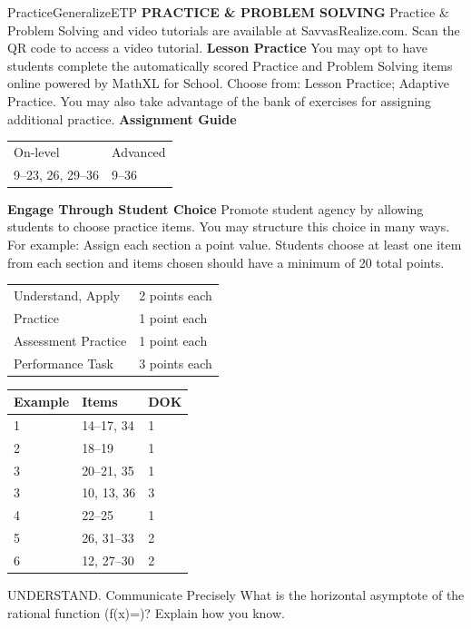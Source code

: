 \documentclass{article}
\newenvironment{item-analysis}{}{}      %
\newenvironment{practice}[2]{}{}        %
\newenvironment{te-addendum}[2]{}{}     %
\newcommand{\answer}[1]{}               %
\newcommand{\uncertain}[2]{#1}          %
\newcommand{\te}[1]{}                   %
\begin{document}
\begin{te-addendum}{Practice}{GeneralizeETP}
\textbf{PRACTICE \& PROBLEM SOLVING}
Practice \& Problem Solving and video tutorials are available at SavvasRealize.com. Scan the QR code to access a video tutorial.
\textbf{Lesson Practice}
You may opt to have students complete the automatically scored Practice and Problem Solving items online powered by MathXL for School.
Choose from: Lesson Practice; Adaptive Practice.
You may also take advantage of the bank of exercises for assigning additional practice.
\textbf{Assignment Guide}
\begin{tabular}{ll}
On-level & Advanced \\
9--23, 26, 29--36 & 9--36 \\
\end{tabular}
\textbf{Engage Through Student Choice}
Promote student agency by allowing students to choose practice items. You may structure this choice in many ways.
For example:
Assign each section a point value. Students choose at least one item from each section and items chosen should have a minimum of 20 total points.
\begin{tabular}{ll}
Understand, Apply & 2 points each \\
Practice & 1 point each \\
Assessment Practice & 1 point each \\
Performance Task & 3 points each \\
\end{tabular}
\end{te-addendum}
\begin{item-analysis}
\begin{tabular}{lll}
\toprule
Example & Items & DOK \\
\midrule
1 & 14--17, 34 & 1 \\
2 & 18--19 & 1 \\
3 & 20--21, 35 & 1 \\
3 & 10, 13, 36 & 3 \\
4 & 22--25 & 1 \\
5 & 26, 31--33 & 2 \\
6 & 12, 27--30 & 2 \\
\bottomrule
\end{tabular}
\te{Items 9 and 11 are absent from the printed Item Analysis; their DOK is marked uncertain in their practice blocks.}
\end{item-analysis}
\begin{practice}{9}{2}
UNDERSTAND. Communicate Precisely What is the horizontal asymptote of the rational function (f(x)=)? Explain how you know.
\te{DOK \uncertain{2}{1 or 3; no DOK printed for item 9}.}
\answer{(y=\frac ad); The rational function has a numerator and denominator of the same degree, so the horizontal asymptote is the ratio of the leading terms.}
\end{practice}
\end{document}

